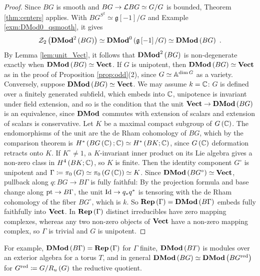 \begin{proof}
Since $BG$ is smooth and $BG\to\cL BG\simeq G/G$ is bounded, Theorem \ref{thm:centers} applies. With
$BG^{S^2}\simeq\mathfrak{g}\left[-1\right]/G$ and Example \ref{exm:DMod0_qsmooth}, it gives
\begin{equation*}
\cZ_2\left(\DMod^2\left(BG\right)\right)\simeq\DMod^0\left(\mathfrak{g}\left[-1\right]/G\right)
\simeq\DMod\left(BG\right) \ .
\end{equation*}
By Lemma \ref{lem:unit_Vect}, it follows that $\DMod^2\left(BG\right)$ is non-degenerate
exactly when $\DMod\left(BG\right)\simeq\Vect$.
If $G$ is unipotent, then $\DMod\left(BG\right)\simeq\Vect$ as in the proof of Proposition
\ref{prop:odd}(2), since $G\simeq\AA^{\dim G}$ as a variety.
Conversely, suppose $\DMod\left(BG\right)\simeq\Vect$.
We may assume $k=\CC$: $G$ is defined over a finitely generated subfield, which embeds into $\CC$,
unipotence is invariant under field extension, and so is the condition that the unit
$\Vect\to\DMod\left(BG\right)$ is an equivalence, since $\DMod$ commutes with extension of scalars and
extension of scalars is conservative.
Let $K$ be a maximal compact subgroup of $G\left(\CC\right)$. The endomorphisms of the unit are
the de Rham cohomology of $BG$, which by the comparison theorem is
$H^*\left(BG\left(\CC\right);\CC\right)\simeq H^*\left(BK;\CC\right)$, since $G\left(\CC\right)$
deformation retracts onto $K$. If $K^\circ\neq1$, a $K$-invariant inner product on its Lie
algebra gives a non-zero class in $H^4\left(BK;\CC\right)$, so $K$ is finite. Then the identity
component $G^\circ$ is unipotent and
$\Gamma\ceqq\pi_0\left(G\right)\simeq\pi_0\left(G\left(\CC\right)\right)\simeq K$. Since
$\DMod\left(BG^\circ\right)\simeq\Vect$, pullback along $q\colon BG\to B\Gamma$ is fully faithful: By
the projection formula and base change along $\pt\to B\Gamma$, the unit $\Id\to q_*q^*$ is
tensoring with the de Rham cohomology of the fiber $BG^\circ$, which is $k$. So
$\Rep\left(\Gamma\right)=\DMod\left(B\Gamma\right)$ embeds fully faithfully into $\Vect$. In
$\Rep\left(\Gamma\right)$ distinct irreducibles have zero mapping complexes, whereas any two
non-zero objects of $\Vect$ have a non-zero mapping complex, so $\Gamma$ is trivial and $G$ is
unipotent.
\end{proof}

For example, $\DMod\left(B\Gamma\right)=\Rep\left(\Gamma\right)$ for $\Gamma$ finite,
$\DMod\left(BT\right)$ is modules over an exterior algebra for a torus $T$, and in general
$\DMod\left(BG\right)\simeq\DMod\left(BG^{\mathrm{red}}\right)$ for $G^{\mathrm{red}}\ceqq G/R_u\left(G\right)$
the reductive quotient.

